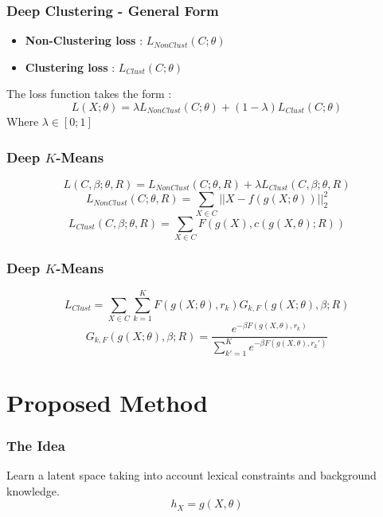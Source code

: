 \documentclass{beamer}
\begin{document}
\begin{frame}
\frametitle{Deep Clustering - General Form}
\begin{itemize}
\item \textbf{Non-Clustering loss} : $L_{NonClust}(C;\theta)$
\item \textbf{Clustering loss} : $L_{Clust}(C;\theta)$
\end{itemize}
\pause
The loss function takes the form :
\begin{equation*}
L(X;\theta) = \lambda L_{NonClust}(C;\theta) + (1-\lambda)L_{Clust}(C; \theta)
\end{equation*}
Where $\lambda \in [0 ; 1]$

\end{frame}
\begin{frame}
  \frametitle{Deep $K$-Means }
\begin{equation*}
L(C ,\beta;\theta,R) = L_{NonClust}(C;\theta,R ) + \lambda L_{Clust}(C,\beta;\theta,R)
\end{equation*}
\begin{equation*}
L_{NonClust}(C;\theta,R ) = \sum_{X \in C} ||X - f(g(X;\theta))||_2^2
\end{equation*}
\begin{equation*}
  L_{Clust}(C,\beta;\theta,R) = \sum_{X \in C} F(g(X),c(g(X, \theta); R))
\end{equation*}
\end{frame}

\begin{frame}
  \frametitle{Deep $K$-Means }
\begin{equation*}
L_{Clust} = \sum_{X \in C} \sum_{k=1}^K F(g(X; \theta), r_k) G_{k, F}(g(X; \theta), \beta; R)
\end{equation*}
\begin{equation*}
G_{k, F}(g(X; \theta), \beta; R) = \frac{e^{-\beta F(g(X, \theta),r_k)}}
{\sum_{k' = 1}^K e^{-\beta F(g(X, \theta),r_k')}}
\end{equation*}
\end{frame}
\section{Proposed Method}

\begin{frame}
\frametitle{The Idea}
Learn a latent space taking into account lexical constraints and
background knowledge.
\pause
\begin{equation*}\label{eq:h}
  h_X = g(X,\theta)
\end{equation*}
\end{frame}
\end{document}
